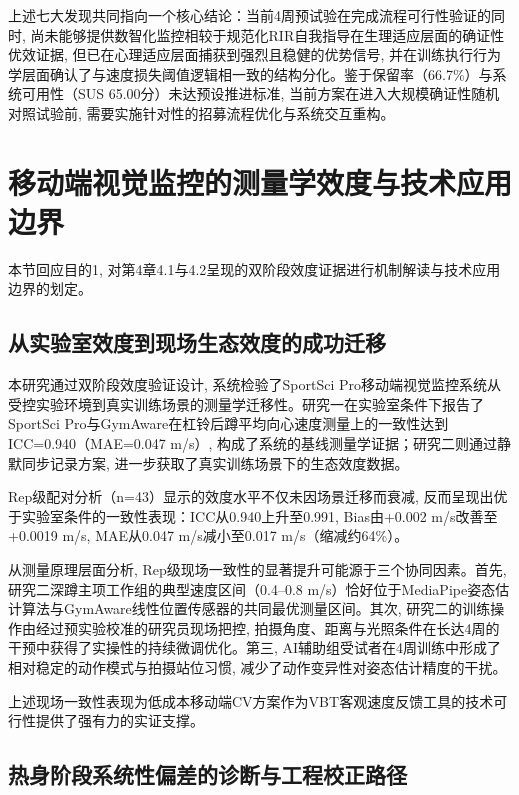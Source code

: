 上述七大发现共同指向一个核心结论：当前4周预试验在完成流程可行性验证的同时, 尚未能够提供数智化监控相较于规范化RIR自我指导在生理适应层面的确证性优效证据, 但已在心理适应层面捕获到强烈且稳健的优势信号, 并在训练执行行为学层面确认了与速度损失阈值逻辑相一致的结构分化。鉴于保留率（66.7\%）与系统可用性（SUS 65.00分）未达预设推进标准, 当前方案在进入大规模确证性随机对照试验前, 需要实施针对性的招募流程优化与系统交互重构。

\section{移动端视觉监控的测量学效度与技术应用边界}
\label{sec:validity_discussion}

本节回应目的1, 对第4章4.1与4.2呈现的双阶段效度证据进行机制解读与技术应用边界的划定。

\subsection{从实验室效度到现场生态效度的成功迁移}
\label{sec:lab_to_field}

本研究通过双阶段效度验证设计, 系统检验了SportSci Pro移动端视觉监控系统从受控实验环境到真实训练场景的测量学迁移性。研究一在实验室条件下报告了SportSci Pro与GymAware在杠铃后蹲平均向心速度测量上的一致性达到ICC=0.940（MAE=0.047 m/s）, 构成了系统的基线测量学证据；研究二则通过静默同步记录方案, 进一步获取了真实训练场景下的生态效度数据。

Rep级配对分析（n=43）显示的效度水平不仅未因场景迁移而衰减, 反而呈现出优于实验室条件的一致性表现：ICC从0.940上升至0.991, Bias由+0.002 m/s改善至+0.0019 m/s, MAE从0.047 m/s减小至0.017 m/s（缩减约64\%）。

从测量原理层面分析, Rep级现场一致性的显著提升可能源于三个协同因素。首先, 研究二深蹲主项工作组的典型速度区间（0.4--0.8 m/s）恰好位于MediaPipe姿态估计算法与GymAware线性位置传感器的共同最优测量区间。其次, 研究二的训练操作由经过预实验校准的研究员现场把控, 拍摄角度、距离与光照条件在长达4周的干预中获得了实操性的持续微调优化。第三, AI辅助组受试者在4周训练中形成了相对稳定的动作模式与拍摄站位习惯, 减少了动作变异性对姿态估计精度的干扰。

上述现场一致性表现为低成本移动端CV方案作为VBT客观速度反馈工具的技术可行性提供了强有力的实证支撑。

\subsection{热身阶段系统性偏差的诊断与工程校正路径}
\label{sec:systematic_bias}

